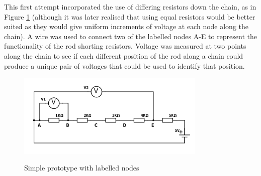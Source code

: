 This first attempt incorporated the use of differing resistors down the chain, as in Figure \ref{fig:5r} (although it was later realised that using equal resistors would be better suited as they would give uniform increments of voltage at each node along the chain). A wire was used to connect two of the labelled nodes A-E to represent the functionality of the rod shorting resistors. Voltage was measured at two points along the chain to see if each different position of the rod along a chain could produce a unique pair of voltages that could be used to identify that position.  \\



\begin{figure}[H]
	\begin{center}
	\includegraphics[width=0.8\textwidth]{5r.png}\\ 
  	\caption{Simple prototype with labelled nodes}
    \label{fig:5r}
    \end{center}
\end{figure}



